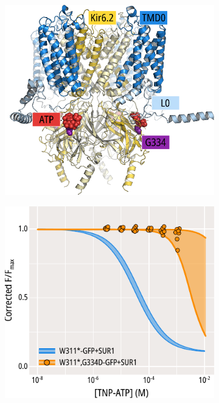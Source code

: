 \begin{figure}[h]
	\centering
	\begin{subfigure}[t]{0.45\textwidth}
		\caption{}\label{ch5fig:g334d_loc}
		\centering
		\includegraphics[width=\textwidth]{g334d_1.pdf}
	\end{subfigure}
	\hfill
	\begin{subfigure}[t]{0.45\textwidth}
		\caption{}\label{ch5fig:g334d_popfits}
		\centering
		\includegraphics[width=\textwidth]{g334d_2.pdf}

\end{subfigure}
\end{figure}
